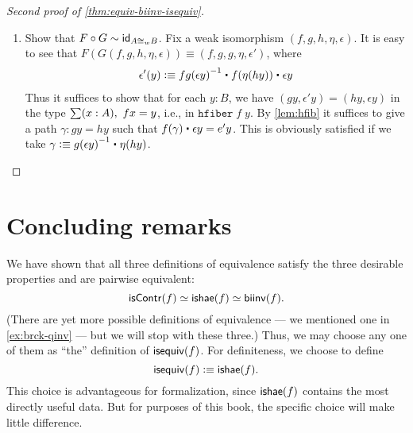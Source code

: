 \begin{proof}[Second proof of \autoref{thm:equiv-biinv-isequiv}]
\begin{enumerate}
\item Show that $F \circ G \sim \idfunc[A \cong_w B]$. Fix a weak isomorphism $(f,g,h,\eta,\epsilon)$. It is easy to see that $F(G(f,g,h,\eta,\epsilon)) \equiv (f,g,g,\eta,\epsilon')$, where
\begin{align*}
\epsilon'(y) \defeq \opp{fg(\epsilon y)} \ct f(\eta (h y)) \ct \epsilon y
\end{align*}
Thus it suffices to show that for each $y : B$, we have $(g y, \epsilon' y) = (h y, \epsilon y)$ in the type $\sm{x : A} f x = y$, i.e., in $\mathtt{hfiber \;} f \; y$. By  \autoref{lem:hfib} it suffices to give a path $\gamma : gy = hy$ such that $f(\gamma) \ct \epsilon y = e' y$. This is obviously satisfied if we take  $\gamma \defeq \opp{g(\epsilon y)} \ct \eta(h y)$.\qedhere
\end{enumerate}

\end{proof}

\section{Concluding remarks}
\label{sec:concluding-remarks}

We have shown that all three definitions of equivalence satisfy the three desirable properties and are pairwise equivalent:
\[ \iscontr(f) \simeq \ishae(f) \simeq \biinv(f) . \]
(There are yet more possible definitions of equivalence --- we mentioned one in \autoref{ex:brck-qinv} --- but we will stop with these three.)
Thus, we may choose any one of them as ``the'' definition of $\isequiv (f)$.
For definiteness, we choose to define
\[ \isequiv(f) \defeq \ishae(f).\]
This choice is advantageous for formalization, since $\ishae(f)$ contains the most directly useful data.
But for purposes of this book, the specific choice will make little difference.





